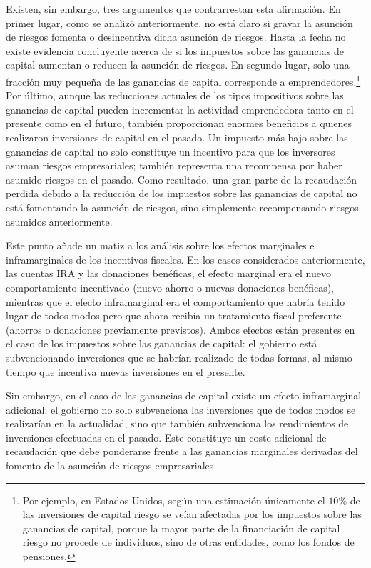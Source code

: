 \documentclass[10pt,a4paper]{article}
\begin{document}
Existen, sin embargo, tres argumentos que contrarrestan esta afirmación. En primer lugar, como se analizó anteriormente, no está claro si gravar la asunción de riesgos fomenta o desincentiva dicha asunción de riesgos. Hasta la fecha no existe evidencia concluyente acerca de si los impuestos sobre las ganancias de capital aumentan o reducen la asunción de riesgos. En segundo lugar, solo una fracción muy pequeña de las ganancias de capital corresponde a emprendedores.\footnote{%
    Por ejemplo, en Estados Unidos, según una estimación únicamente el $10\%$ de las inversiones de capital riesgo se veían afectadas por los impuestos sobre las ganancias de capital, porque la mayor parte de la financiación de capital riesgo no procede de individuos, sino de otras entidades, como los fondos de pensiones.
} Por último, aunque las reducciones actuales de los tipos impositivos sobre las ganancias de capital pueden incrementar la actividad emprendedora tanto en el presente como en el futuro, también proporcionan enormes beneficios a quienes realizaron inversiones de capital en el pasado. Un impuesto más bajo sobre las ganancias de capital no solo constituye un incentivo para que los inversores asuman riesgos empresariales; también representa una recompensa por haber asumido riesgos en el pasado. Como resultado, una gran parte de la recaudación perdida debido a la reducción de los impuestos sobre las ganancias de capital no está fomentando la asunción de riesgos, sino simplemente recompensando riesgos asumidos anteriormente.

Este punto añade un matiz a los análisis sobre los efectos marginales e inframarginales de los incentivos fiscales. En los casos considerados anteriormente, las cuentas IRA y las donaciones benéficas, el efecto marginal era el nuevo comportamiento incentivado (nuevo ahorro o nuevas donaciones benéficas), mientras que el efecto inframarginal era el comportamiento que habría tenido lugar de todos modos pero que ahora recibía un tratamiento fiscal preferente (ahorros o donaciones previamente previstos). Ambos efectos están presentes en el caso de los impuestos sobre las ganancias de capital: el gobierno está subvencionando inversiones que se habrían realizado de todas formas, al mismo tiempo que incentiva nuevas inversiones en el presente.

Sin embargo, en el caso de las ganancias de capital existe un efecto inframarginal adicional: el gobierno no solo subvenciona las inversiones que de todos modos se realizarían en la actualidad, sino que también subvenciona los rendimientos de inversiones efectuadas en el pasado. Este constituye un coste adicional de recaudación que debe ponderarse frente a las ganancias marginales derivadas del fomento de la asunción de riesgos empresariales.
\end{document}

